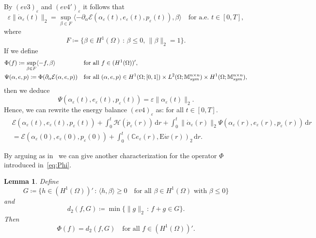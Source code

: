 \documentclass[reqno]{amsart}
\newtheorem{lemma}[corollary]{Lemma}
\theoremstyle{definition}
\numberwithin{equation}{section}
\def\de {\mathrm{d}}
\def\M {\mathbb M^{n\times n}_{\rm sym}}
\def\C {\mathbb C}
\def\EE {\mathrm{E}}
\begin{document}
By $(ev3)_\varepsilon$ and $(ev4')_\varepsilon$ it follows that
\begin{equation*}
\varepsilon\|\dot \alpha_\varepsilon(t)\|_2=\sup_{\beta\in F}\langle -\partial_\alpha \mathcal E(\alpha_\varepsilon(t),e_\varepsilon(t),p_\varepsilon(t)),\beta\rangle\quad\text{for a.e.\ $t\in[0,T]$},
\end{equation*}
where 
$$F\coloneqq \{\beta\in H^1(\Omega)\,:\,\beta\le 0,\,\|\beta\|_2=1\}.$$
If we define
\begin{align}
&\Phi(f)\coloneqq \sup_{\beta\in F}\langle -f, \beta\rangle& &\text{for all $f\in (H^1(\Omega))'$},\label{eq:Phi}\\
&\Psi(\alpha,e,p)\coloneqq \Phi(\partial_\alpha \mathcal E(\alpha,e,p))& &\text{for all $(\alpha,e,p)\in H^1(\Omega;[0,1])\times L^2(\Omega;\M)\times H^1(\Omega;\M)$},\label{eq:Psi}
\end{align}
then we deduce
\begin{equation}\label{eq:Psi_eps}
\Psi(\alpha_\varepsilon(t),e_\varepsilon(t),p_\varepsilon(t))=\varepsilon\|\alpha_\varepsilon(t)\|_2.
\end{equation}
Hence, we can rewrite the energy balance $(ev4)_\varepsilon$ as: for all $t\in[0,T]$.
\begin{align*}
&\mathcal E(\alpha_\varepsilon(t),e_\varepsilon(t),p_\varepsilon(t))+\int_0^t\mathcal H(\dot p_\varepsilon(r)) \,\de r+\int_0^t\|\dot\alpha_\varepsilon(r)\|_2\Psi(\alpha_\varepsilon(r),e_\varepsilon(r),p_\varepsilon(r)) \,\de r\\
&=\mathcal E(\alpha_\varepsilon(0),e_\varepsilon(0),p_\varepsilon(0))+\int_0^t(\C e_\varepsilon(r),\EE \dot w(r))_2 \,\de r.
 \end{align*}

By arguing as in~\cite[Lemma 4.4]{CrLa} we can give another characterization for the operator $\Phi$ introduced in~\eqref{eq:Phi}.

\begin{lemma}\label{lem:Psi}
Define
$$G\coloneqq \{h\in (H^1(\Omega))'\,:\,\langle h,\beta\rangle\ge 0\quad\text{for all $\beta\in H^1(\Omega)$ with $\beta\le 0$}\}$$
and 
$$d_2(f,G)\coloneqq \min\{\|g\|_2\,:\,f+g\in G\}.$$
Then
$$\Phi(f)=d_2(f,G)\quad\text{for all $f\in (H^1(\Omega))'$}.$$
\end{lemma}
\end{document}
